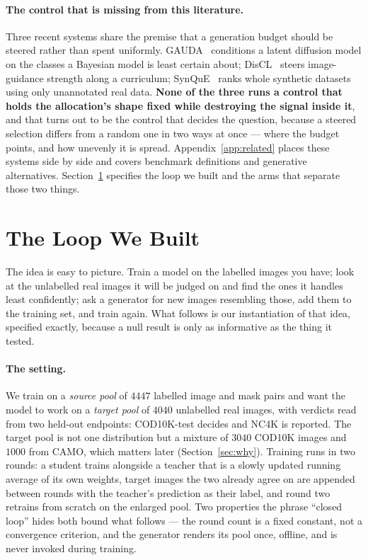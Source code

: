 \documentclass{article} %
\begin{document}
\paragraph{The control that is missing from this literature.} Three recent systems share the premise
that a generation budget should be steered rather than spent uniformly.
GAUDA~\citep{frisch2025gauda} conditions a latent diffusion model on the classes a Bayesian model is
least certain about; DisCL~\citep{liang2025discl} steers image-guidance strength along a curriculum;
SynQuE~\citep{chen2025synque} ranks whole synthetic datasets using only unannotated real data.
\textbf{None of the three runs a control that holds the allocation's shape fixed while destroying
the signal inside it}, and that turns out to be the control that decides the question, because a
steered selection differs from a random one in two ways at once --- where the budget points, and how
unevenly it is spread. Appendix~\ref{app:related} places these systems side by side and covers
benchmark definitions and generative alternatives. Section~\ref{sec:method} specifies the loop we
built and the arms that separate those two things.

\section{The Loop We Built}
\label{sec:method}
The idea is easy to picture. Train a model on the labelled images you have; look at the unlabelled
real images it will be judged on and find the ones it handles least confidently; ask a generator for
new images resembling those, add them to the training set, and train again. What follows is our
instantiation of that idea, specified exactly, because a null result is only as informative as the
thing it tested.

\paragraph{The setting.} We train on a \emph{source pool} of $4447$ labelled image and mask pairs
and want the model to work on a \emph{target pool} of $4040$ unlabelled real images, with verdicts
read from two held-out endpoints: COD10K-test decides and NC4K is reported. The target pool is not
one distribution but a mixture of $3040$ COD10K images and $1000$ from CAMO, which matters later
(Section~\ref{sec:why}). Training runs in two rounds: a student trains alongside a teacher that is a slowly updated running
average of its own weights, target images the two already agree on are appended between rounds with
the teacher's prediction as their label, and round two retrains from scratch on the enlarged pool.
Two properties the phrase ``closed loop'' hides both bound what follows --- the round count is a
fixed constant, not a convergence criterion, and the generator renders its pool once, offline, and
is never invoked during training.
\end{document}
